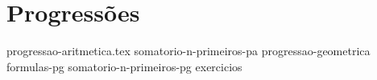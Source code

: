 \chapter{Progressões}
{
    \newcommand{\chapterdir}{../capitulos/progressoes/}

    {progressao-aritmetica.tex}
    {somatorio-n-primeiros-pa}
    {progressao-geometrica}
    {formulas-pg}
    {somatorio-n-primeiros-pg}
    {exercicios}
}